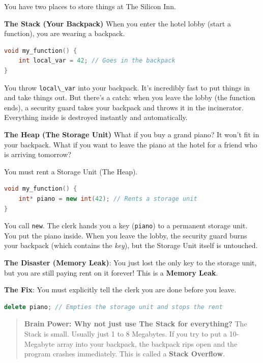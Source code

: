 You have two places to store things at The Silicon Inn.

\textbf{The Stack (Your Backpack)} When you enter the hotel lobby (start
a function), you are wearing a backpack.

\begin{lstlisting}[language={C++}]
void my_function() {
    int local_var = 42; // Goes in the backpack
}
\end{lstlisting}

You throw \passthrough{\lstinline!local\_var!} into your backpack. It's
incredibly fast to put things in and take things out. But there's a
catch: when you leave the lobby (the function ends), a security guard
takes your backpack and throws it in the incinerator. Everything inside
is destroyed instantly and automatically.

\textbf{The Heap (The Storage Unit)} What if you buy a grand piano? It
won't fit in your backpack. What if you want to leave the piano at the
hotel for a friend who is arriving tomorrow?

You must rent a Storage Unit (The Heap).

\begin{lstlisting}[language={C++}]
void my_function() {
    int* piano = new int(42); // Rents a storage unit
}
\end{lstlisting}

You call \passthrough{\lstinline!new!}. The clerk hands you a key
(\passthrough{\lstinline!piano!}) to a permanent storage unit. You put
the piano inside. When you leave the lobby, the security guard burns
your backpack (which contains the \emph{key}), but the Storage Unit
itself is untouched.

\textbf{The Disaster (Memory Leak)}: You just lost the only key to the
storage unit, but you are still paying rent on it forever! This is a
\textbf{Memory Leak}.

\textbf{The Fix}: You must explicitly tell the clerk you are done before
you leave.

\begin{lstlisting}[language={C++}]
    delete piano; // Empties the storage unit and stops the rent
\end{lstlisting}

\begin{quote}
\textbf{Brain Power: Why not just use The Stack for everything?} The
Stack is small. Usually just 1 to 8 Megabytes. If you try to put a
10-Megabyte array into your backpack, the backpack rips open and the
program crashes immediately. This is called a \textbf{Stack Overflow}.
\end{quote}

